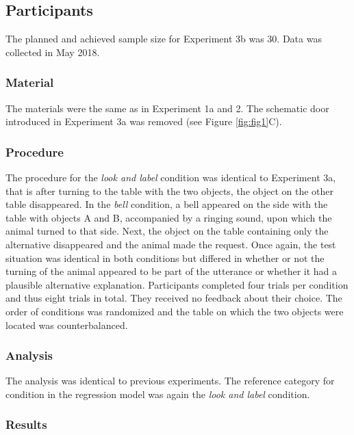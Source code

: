 \documentclass[
  man,floatsintext]{apa6}
\begin{document}
\subsection{Participants}\label{participants-4}

The planned and achieved sample size for Experiment 3b was 30. Data was collected in May 2018.

\subsubsection{Material}\label{material-4}

The materials were the same as in Experiment 1a and 2. The schematic door introduced in Experiment 3a was removed (see Figure \ref{fig:fig1}C).

\subsubsection{Procedure}\label{procedure-4}

The procedure for the \emph{look and label} condition was identical to Experiment 3a, that is after turning to the table with the two objects, the object on the other table disappeared. In the \emph{bell} condition, a bell appeared on the side with the table with objects A and B, accompanied by a ringing sound, upon which the animal turned to that side. Next, the object on the table containing only the alternative disappeared and the animal made the request. Once again, the test situation was identical in both conditions but differed in whether or not the turning of the animal appeared to be part of the utterance or whether it had a plausible alternative explanation. Participants completed four trials per condition and thus eight trials in total. They received no feedback about their choice. The order of conditions was randomized and the table on which the two objects were located was counterbalanced.

\subsubsection{Analysis}\label{analysis-4}

The analysis was identical to previous experiments. The reference category for condition in the regression model was again the \emph{look and label} condition.

\subsubsection{Results}\label{results-4}
\end{document}
